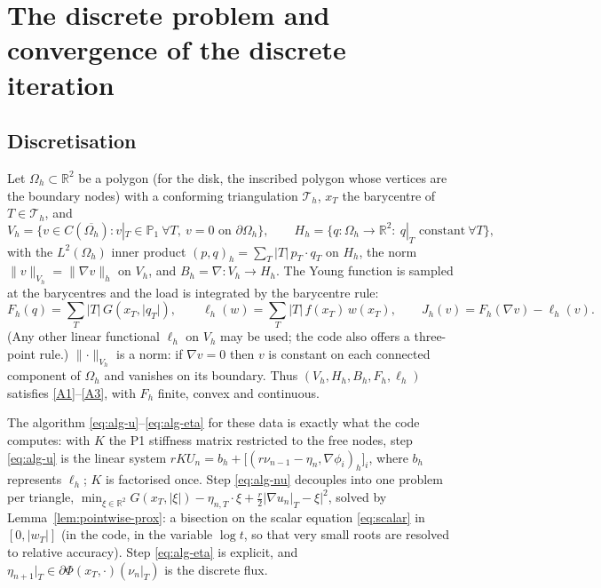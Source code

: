 \documentclass[11pt]{amsart}
\theoremstyle{definition}
\theoremstyle{remark}
\numberwithin{equation}{section}
\newcommand{\R}{\mathbb{R}}
\newcommand{\abs}[1]{\lvert #1\rvert}
\newcommand{\norm}[1]{\lVert #1\rVert}
\begin{document}
\section{The discrete problem and convergence of the discrete iteration}\label{sec:discrete}

\subsection{Discretisation}
Let $\Omega_h\subset\R^2$ be a polygon (for the disk, the inscribed polygon whose vertices are the boundary nodes) with a conforming triangulation $\mathcal T_h$, $x_T$ the barycentre of $T\in\mathcal T_h$, and
\[
V_h=\{v\in C(\overline{\Omega_h}):v|_T\in\mathbb P_1\ \forall T,\ v=0\text{ on }\partial\Omega_h\},\qquad
H_h=\{q\colon\Omega_h\to\R^2:\ q|_T\text{ constant}\ \forall T\},
\]
with the $L^2(\Omega_h)$ inner product $(p,q)_h=\sum_T\abs T\,p_T\cdot q_T$ on $H_h$, the norm $\norm{v}_{V_h}=\norm{\nabla v}_h$ on $V_h$, and $B_h=\nabla\colon V_h\to H_h$. The Young function is sampled at the barycentres and the load is integrated by the barycentre rule:
\[
F_h(q)=\sum_{T}\abs T\,G(x_T,\abs{q_T}),\qquad \ell_h(w)=\sum_T\abs T\,f(x_T)\,w(x_T),\qquad J_h(v)=F_h(\nabla v)-\ell_h(v).
\]
(Any other linear functional $\ell_h$ on $V_h$ may be used; the code also offers a three-point rule.) $\norm\cdot_{V_h}$ is a norm: if $\nabla v=0$ then $v$ is constant on each connected component of $\Omega_h$ and vanishes on its boundary. Thus $(V_h,H_h,B_h,F_h,\ell_h)$ satisfies \ref{A1}--\ref{A3}, with $F_h$ finite, convex and continuous.

The algorithm \eqref{eq:alg-u}--\eqref{eq:alg-eta} for these data is exactly what the code computes: with $K$ the P1 stiffness matrix restricted to the free nodes, step \eqref{eq:alg-u} is the linear system $rKU_n=b_h+\big[(r\nu_{n-1}-\eta_n,\nabla\phi_i)_h\big]_i$, where $b_h$ represents $\ell_h$; $K$ is factorised once. Step \eqref{eq:alg-nu} decouples into one problem per triangle, $\min_{\xi\in\R^2}G(x_T,\abs\xi)-\eta_{n,T}\cdot\xi+\frac r2\abs{\nabla u_n|_T-\xi}^2$, solved by Lemma~\ref{lem:pointwise-prox}: a bisection on the scalar equation \eqref{eq:scalar} in $[0,\abs{w_T}]$ (in the code, in the variable $\log t$, so that very small roots are resolved to relative accuracy). Step \eqref{eq:alg-eta} is explicit, and $\eta_{n+1}|_T\in\partial\Phi(x_T,\cdot)(\nu_n|_T)$ is the discrete flux.
\end{document}
